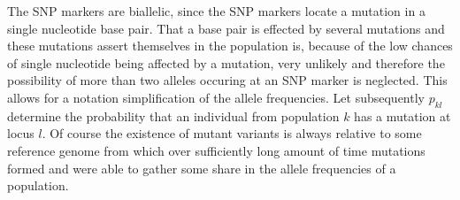 \documentclass[a4paper, 11pt]{article}
\begin{document}

The SNP markers are biallelic, since the SNP markers locate a mutation in a single nucleotide base pair. That a base pair is effected by several mutations and these mutations assert themselves in the population is, because of the low chances of single nucleotide being affected by a mutation, very unlikely and therefore the possibility of more than two alleles occuring at an SNP marker is neglected. This allows for a notation simplification of the allele frequencies. Let subsequently  $p_{kl}$ determine the probability that an individual from population $k$ has a mutation at locus $l$. Of course the existence of mutant variants is always relative to some reference genome from which over sufficiently long amount of time mutations formed and were able to gather some share in the allele frequencies of a population.\\

\end{document}
